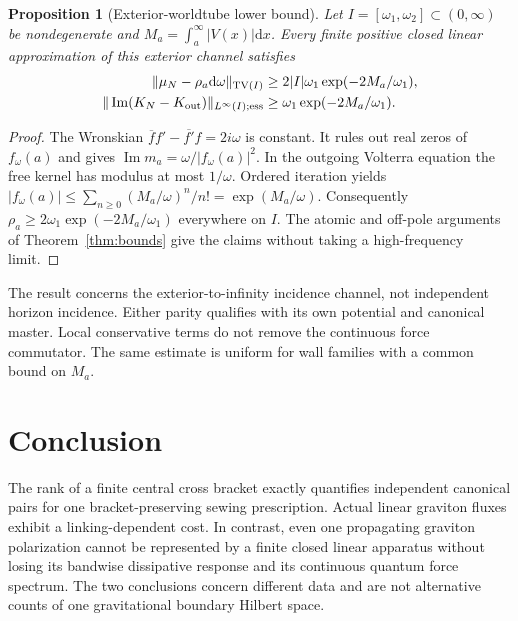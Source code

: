 \documentclass[11pt]{article}
\newtheorem{proposition}[theorem]{Proposition}
\newcommand{\dd}{\mathrm d}
\newcommand{\TV}{\mathrm{TV}}
\begin{document}
\begin{proposition}[Exterior-worldtube lower bound]\label{prop:schwarzschild}
Let \(I=[\omega_1,\omega_2]\subset(0,\infty)\) be nondegenerate and \(M_a=\int_a^\infty |V(x)|\dd x\). Every finite positive closed linear approximation of this exterior channel satisfies
\begin{align*}
 \|\mu_N-\rho_a\dd\omega\|_{\TV(I)}&\ge
 2|I|\omega_1\exp(-2M_a/\omega_1),\\
 \|\operatorname{Im}(K_N-K_{\rm out})\|_{L^\infty(I);{\rm ess}}
 &\ge \omega_1\exp(-2M_a/\omega_1).
\end{align*}
\end{proposition}
\begin{proof}
The Wronskian \(\overline f f'-\overline{f'}f=2i\omega\) is constant. It rules out real zeros of \(f_\omega(a)\) and gives \(\operatorname{Im}m_a=\omega/|f_\omega(a)|^2\). In the outgoing Volterra equation the free kernel has modulus at most \(1/\omega\). Ordered iteration yields \(|f_\omega(a)|\le\sum_{n\ge0}(M_a/\omega)^n/n!=\exp(M_a/\omega)\). Consequently \(\rho_a\ge2\omega_1\exp(-2M_a/\omega_1)\) everywhere on \(I\). The atomic and off-pole arguments of Theorem~\ref{thm:bounds} give the claims without taking a high-frequency limit.
\end{proof}
The result concerns the exterior-to-infinity incidence channel, not independent horizon incidence. Either parity qualifies with its own potential and canonical master. Local conservative terms do not remove the continuous force commutator. The same estimate is uniform for wall families with a common bound on \(M_a\).

\section{Conclusion}
The rank of a finite central cross bracket exactly quantifies independent canonical pairs for one bracket-preserving sewing prescription. Actual linear graviton fluxes exhibit a linking-dependent cost. In contrast, even one propagating graviton polarization cannot be represented by a finite closed linear apparatus without losing its bandwise dissipative response and its continuous quantum force spectrum. The two conclusions concern different data and are not alternative counts of one gravitational boundary Hilbert space.
\end{document}
